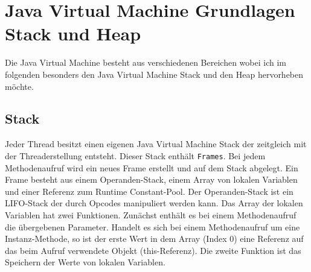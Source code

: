 \documentclass[conference]{IEEEtran}
\begin{document}
\section{Java Virtual Machine Grundlagen Stack und Heap}

Die Java Virtual Machine besteht aus verschiedenen Bereichen wobei ich im folgenden besonders den Java Virtual Machine Stack und den Heap hervorheben möchte.

\subsection{Stack}
Jeder Thread besitzt einen eigenen Java Virtual Machine Stack der zeitgleich mit der Threaderstellung entsteht. Dieser Stack enthält \verb|Frames|. Bei jedem Methodenaufruf wird ein neues Frame erstellt und auf dem Stack abgelegt. Ein Frame besteht aus einem Operanden-Stack, einem Array von lokalen Variablen und einer Referenz zum Runtime Constant-Pool. Der Operanden-Stack ist ein LIFO-Stack der durch Opcodes manipuliert werden kann. Das Array der lokalen Variablen hat zwei Funktionen. Zunächst enthält es bei einem Methodenaufruf die übergebenen Parameter. Handelt es sich bei einem Methodenaufruf um eine Instanz-Methode, so ist der erste Wert in dem Array (Index 0) eine Referenz auf das beim Aufruf verwendete Objekt (this-Referenz). Die zweite Funktion ist das Speichern der Werte von lokalen Variablen. 
\end{document}
